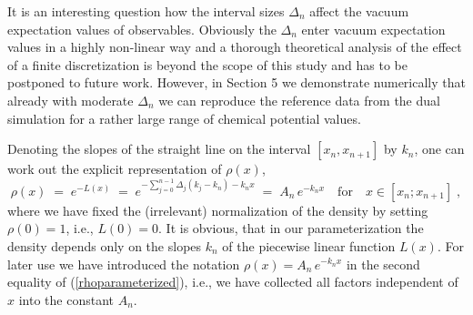 \documentclass[a4paper,11pt]{article}
\begin{document}
It is an interesting question how the interval sizes $\Delta_n$ affect the vacuum expectation values of observables. 
Obviously the $\Delta_n$ enter vacuum expectation values in a highly non-linear way and a thorough theoretical analysis of 
the effect of a finite discretization is beyond the scope of this study and has to be postponed to future work. However, 
in Section 5 we demonstrate numerically 
that already with moderate $\Delta_n$ we can reproduce the reference data from the dual simulation 
for a rather large range of chemical potential values. 

Denoting the slopes of the straight line on the interval $[x_n, x_{n+1}]$ by $k_n$, one can work out the 
explicit representation of $\rho(x)$,
\begin{equation}
\rho(x) \; = \; e^{-L(x)} \; = \; e^{- \sum\limits_{j=0}^{n-1} \Delta_j (k_j-k_n) - k_n x} \; 
= \; A_n \, e^{-k_n x} \quad \mbox{for} 
\quad x \in [x_n;x_{n+1}]  \; ,
\label{rhoparameterized}
\end{equation}
where we have fixed the (irrelevant) normalization of the density by setting $\rho(0)=1$, i.e., $L(0)=0$.
It is obvious, that in our parameterization the density depends only on the slopes $k_n$ of the piecewise
linear function $L(x)$. For later use we have introduced the notation $\rho(x) = A_n \, e^{- k_n x}$ in the second
equality of (\ref{rhoparameterized}), i.e., we have collected all factors independent of $x$ into the constant $A_n$.
\end{document}
